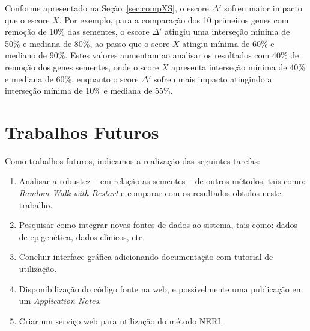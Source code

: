Conforme apresentado na Seção~\ref{sec:compXS}, o escore $\Delta'$ sofreu maior impacto que o escore $X$.
Por exemplo, para a comparação dos 10 primeiros genes com remoção de 10\% das sementes, o escore $\Delta'$ atingiu uma interseção mínima de 50\% e mediana de 80\%, ao passo que o score $X$ atingiu mínima de 60\% e mediano de 90\%.
%
Estes valores aumentam ao analisar os resultados com 40\% de remoção dos genes sementes, onde o score $X$ apresenta interseção mínima de 40\% e mediana de 60\%, enquanto o score $\Delta'$ sofreu mais impacto atingindo a interseção mínima de 10\% e mediana de 55\%.

\section{Trabalhos Futuros}

Como trabalhos futuros, indicamos a realização das seguintes tarefas:

\begin{enumerate}

\item Analisar a robustez -- em relação as sementes -- de outros métodos, tais como: \textsl{Random Walk with Restart} e comparar com os resultados obtidos neste trabalho.

\item Pesquisar como integrar novas fontes de dados ao sistema, tais como: dados de epigenética, dados clínicos, etc.
    
\item Concluir interface gráfica adicionando documentação com tutorial de utilização.

\item Disponibilização do código fonte na web, e possivelmente uma publicação em um \textsl{Application Notes}.

\item Criar um serviço web para utilização do método NERI.

\end{enumerate}
